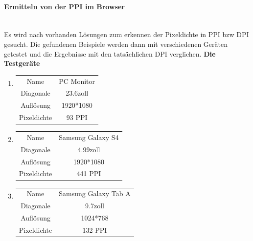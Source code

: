 \paragraph{Ermitteln von der PPI im Browser}
\mbox{}\\
Es wird nach vorhanden Lösungen zum erkennen der Pixeldichte in PPI bzw DPI gesucht.
Die gefundenen Beispiele werden dann mit verschiedenen Geräten getestet und die Ergebnisse mit den tatsächlichen DPI verglichen.
\newline\textbf{Die Testgeräte}
\begin{enumerate}
	\item \begin{tabular}{cc}
	      Name & PC Monitor\\
	      Diagonale & 23.6zoll\\
	      Auflösung & 1920*1080\\
	      Pixeldichte & 93 PPI \\
	\end{tabular}
	\item \begin{tabular}{cc}
	      Name & Samsung Galaxy S4\\
	      Diagonale & 4.99zoll\\
	      Auflösung & 1920*1080\\
	      Pixeldichte & 441 PPI
	\end{tabular}
	\item \begin{tabular}{cc}
	      Name & Samsung Galaxy Tab A\\
	      Diagonale & 9.7zoll\\
	      Auflösung & 1024*768\\
	      Pixeldichte & 132 PPI\\
	\end{tabular}
\end{enumerate}
\newpage

